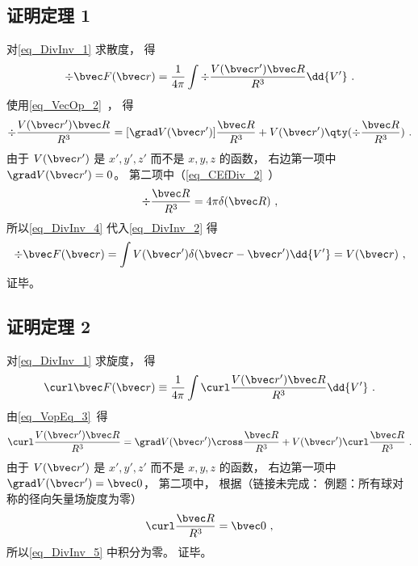 \subsection{证明定理 1}
对\autoref{eq_DivInv_1} 求散度， 得
\begin{equation}\label{eq_DivInv_2}
\div \bvec F(\bvec r) = \frac{1}{4\pi}\int \div \frac{V(\bvec r') \bvec R}{R^3} \dd{V'}~.
\end{equation}
使用\autoref{eq_VecOp_2}~， 得
\begin{equation}\label{eq_DivInv_4}
\div \frac{V(\bvec r') \bvec R}{R^3} = [\grad V(\bvec r')] \frac{ \bvec R}{R^3} + V(\bvec r') \qty(\div \frac{\bvec R}{R^3})~.
\end{equation}
由于 $V(\bvec r')$ 是 $x', y', z'$ 而不是 $x, y, z$ 的函数， 右边第一项中 $\grad V(\bvec r') = 0$。 第二项中（\autoref{eq_CEfDiv_2}~）
\begin{equation}
\div \frac{\bvec R}{R^3} = 4\pi \delta(\bvec R)~,
\end{equation}
所以\autoref{eq_DivInv_4} 代入\autoref{eq_DivInv_2} 得
\begin{equation}
\div \bvec F(\bvec r) = \int V(\bvec r') \delta(\bvec r - \bvec r') \dd{V'} = V(\bvec r)~,
\end{equation}
证毕。

\subsection{证明定理 2}
对\autoref{eq_DivInv_1} 求旋度， 得
\begin{equation}\label{eq_DivInv_5}
\curl \bvec F(\bvec r) \equiv \frac{1}{4\pi}\int \curl \frac{V(\bvec r') \bvec R}{R^3} \dd{V'}~.
\end{equation}
由\autoref{eq_VopEq_3}~得
\begin{equation}
\curl \frac{V(\bvec r') \bvec R}{R^3} = \grad V(\bvec r') \cross \frac{\bvec R}{R^3} + V(\bvec r') \curl \frac{\bvec R}{R^3}~.
\end{equation}
由于 $V(\bvec r')$ 是 $x', y', z'$ 而不是 $x, y, z$ 的函数， 右边第一项中 $\grad V(\bvec r') = \bvec 0$， 第二项中， 根据（链接未完成： 例题：所有球对称的径向矢量场旋度为零）
\begin{equation}
\curl \frac{\bvec R}{R^3} = \bvec 0~,
\end{equation}
所以\autoref{eq_DivInv_5} 中积分为零。 证毕。
